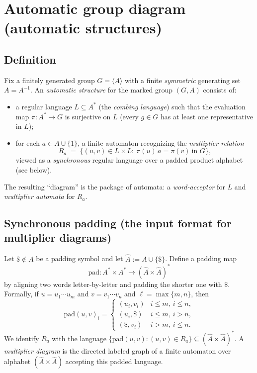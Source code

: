 \documentclass[11pt]{article}
\theoremstyle{definition}
\theoremstyle{plain}
\theoremstyle{remark}
\begin{document}
\clearpage
\section{Automatic group diagram (automatic structures)}

\subsection*{Definition}
Fix a finitely generated group $G=\langle A\rangle$ with a finite \emph{symmetric} generating set $A=A^{-1}$.
An \emph{automatic structure} for the marked group $(G,A)$ consists of:
\begin{itemize}[leftmargin=2em]
\item a regular language $L\subseteq A^*$ (the \emph{combing language}) such that the evaluation map
$\pi:A^*\to G$ is surjective on $L$ (every $g\in G$ has at least one representative in $L$);
\item for each $a\in A\cup\{1\}$, a finite automaton recognizing the \emph{multiplier relation}
\[
R_a \;=\;\{(u,v)\in L\times L:\ \pi(u)\,a=\pi(v)\ \text{in }G\},
\]
viewed as a \emph{synchronous} regular language over a padded product alphabet (see below).
\end{itemize}
The resulting ``diagram'' is the package of automata: a \emph{word-acceptor} for $L$ and \emph{multiplier automata} for $R_a$.

\subsection*{Synchronous padding (the input format for multiplier diagrams)}
Let $\$ \notin A$ be a padding symbol and let $\widehat A:=A\cup\{\$\}$.
Define a padding map
\[
\mathrm{pad}:A^*\times A^*\longrightarrow (\widehat A\times \widehat A)^*
\]
by aligning two words letter-by-letter and padding the shorter one with $\$$.
Formally, if $u=u_1\cdots u_m$ and $v=v_1\cdots v_n$ and $\ell=\max\{m,n\}$, then
\[
\mathrm{pad}(u,v)_i=
\begin{cases}
(u_i,v_i) & i\le m,\ i\le n,\\
(u_i,\$)  & i\le m,\ i>n,\\
(\$,v_i)  & i>m,\ i\le n.
\end{cases}
\]
We identify $R_a$ with the language $\{\mathrm{pad}(u,v):(u,v)\in R_a\}\subseteq(\widehat A\times\widehat A)^*$.
A \emph{multiplier diagram} is the directed labeled graph of a finite automaton over alphabet $(\widehat A\times\widehat A)$
accepting this padded language.
\end{document}
